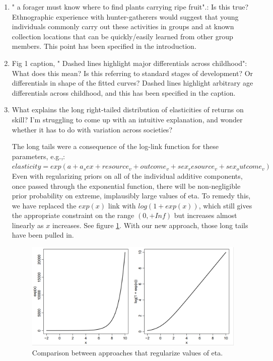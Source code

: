 \documentclass{article}
\newcommand{\rev}[1]{{\color{ForestGreen}#1}}
\begin{document}
\begin{enumerate}
    \item " a forager must know where to find plants carrying ripe fruit".: Is this true? Ethnographic  experience with hunter-gatherers would suggest that young individuals commonly carry out these activities in groups and at known collection locations that can be quickly/easily learned from other group members. \rev{This point has been specified in the introduction.}
    
    \item Fig 1 caption, " Dashed lines highlight major differentials across childhood": What does this mean? Is this referring to standard stages of development? Or differentials in shape of the fitted  curves? \rev{Dashed lines highlight arbitrary age differentials across childhood, and this has been specified in the caption.}
    
    \item What explains the long right-tailed distribution of elasticities of returns on skill? I'm struggling  to come up with an intuitive explanation, and wonder whether it has to do with variation across  societies? 
    
\rev{The long tails were a consequence of the log-link function for these parameters, e.g.,:  $elasticity = exp( a + a_sex + resource_v + outcome_v + sex_resource_v + sex_outcome_v )$ Even with regularizing priors on all of the individual additive components, once passed through the exponential function, there will be non-negligible prior probability on extreme, implausibly large values of eta. To remedy this, we have replaced the $exp(x)$ link with $log(1 + exp(x))$, which still gives the appropriate constraint on the range $(0,+Inf)$ but increases almost linearly as $x$ increases. See figure \ref{fig:reply_1}. With our new approach, those long tails have been pulled in. }

\begin{figure}
    \centering
    \includegraphics[width=12cm]{text/images/reply_1.png}
    \caption{Comparison between approaches that regularize values of eta.}
    \label{fig:reply_1}
\end{figure}
    

\end{enumerate}
\end{document}
